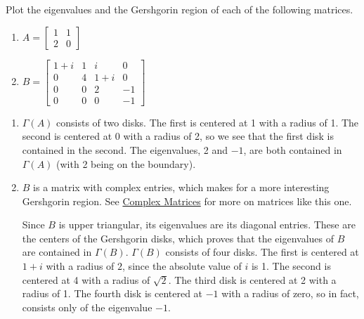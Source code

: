 \documentclass{ximera}
\begin{document}
\begin{example}\label{exa:plot_Gersh}
Plot the eigenvalues and the Gershgorin region of each of the following matrices.
\begin{enumerate}
    \item $A=\begin{bmatrix}
    1 & 1 \\
    2 & 0 \end{bmatrix}$
    \item $B=\begin{bmatrix}
    1+i & 1 & i & 0\\ 
    0 & 4 & 1+i & 0\\ 
    0 & 0 & 2 & -1 \\
    0 & 0 & 0 & -1\end{bmatrix}$
\end{enumerate}

\begin{explanation}

\begin{enumerate}
    \item $\Gamma(A)$ consists of two disks.  The first is centered at 1 with a radius of 1.  The second is centered at 0 with a radius of 2, so we see that the first disk is contained in the second.  The eigenvalues, 2 and $-1$, are both contained in $\Gamma(A)$ (with 2 being on the boundary).
    \item $B$ is a matrix with complex entries, which makes for a more interesting Gershgorin region.  See \href{https://ximera.osu.edu/linearalgebradzv3/LinearAlgebraInteractiveIntro/RTH-0050/main}{Complex Matrices} for more on matrices like this one.
    
    Since $B$ is upper triangular, its eigenvalues are its diagonal entries.  These are the centers of the Gershgorin disks, which proves that the eigenvalues of $B$ are contained in $\Gamma(B)$.  $\Gamma(B)$ consists of four disks.  The first is centered at $1+i$ with a radius of $2$, since the absolute value of $i$ is 1.   The second is centered at 4 with a radius of $\sqrt{2}$.  The third disk is centered at 2 with a radius of 1.  The fourth disk is centered at $-1$ with a radius of zero, so in fact, consists only of the eigenvalue $-1$.
\end{enumerate}

\end{explanation}
\end{example}
\end{document}
